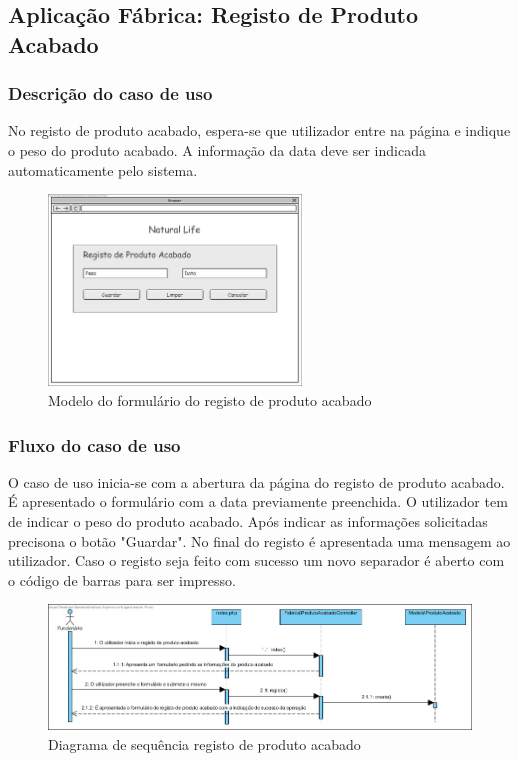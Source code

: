 \subsection{Aplicação Fábrica: Registo de Produto Acabado}
\subsubsection*{Descrição do caso de uso}
No registo de produto acabado, espera-se que utilizador entre na página e indique o peso do produto acabado. A informação da data deve ser indicada automaticamente pelo sistema. 

\begin{figure}[H] 
	\begin{center}
		\includegraphics[width=0.60\textwidth,keepaspectratio]{figuras/Diagramas_vp/DI_Fabrica_4_Registo_de_Produto_Acabado.jpg}
		\caption{Modelo do formulário do registo de produto acabado}
		\label{fig:di_prod_acabado} 
	\end{center}
\end{figure}

\subsubsection*{Fluxo do caso de uso}
O caso de uso inicia-se com a abertura da página do registo de produto acabado. É apresentado o formulário com a data previamente preenchida. O utilizador tem de indicar o peso do produto acabado. Após indicar as informações solicitadas precisona o botão "Guardar". No final do registo é apresentada uma mensagem ao utilizador. Caso o registo seja feito com sucesso um novo separador é aberto com o código de barras para ser impresso.


\begin{figure}[H] 
	\begin{center}
		\includegraphics[width=\textwidth,keepaspectratio]{figuras/Diagramas_vp/SD_Fabrica_4_Registo_de_Produto_Acabado.jpg}
		\caption{Diagrama de sequência registo de produto acabado}
		\label{fig:sd_prod_acabado} 
	\end{center}
\end{figure}